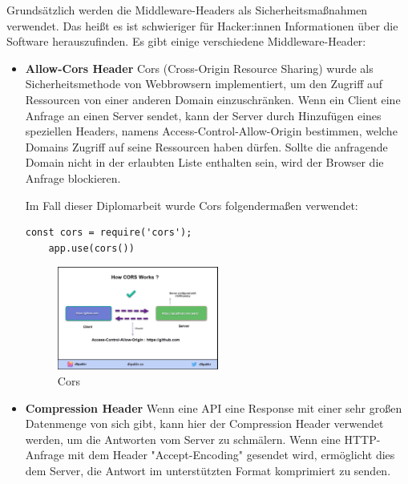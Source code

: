 Grundsätzlich werden die Middleware-Headers als Sicherheitsmaßnahmen verwendet. Das heißt es ist schwieriger für Hacker:innen Informationen über die Software herauszufinden. Es gibt einige verschiedene Middleware-Header:

\begin{itemize}
    \item \textbf{Allow-Cors Header}
        \newline
        Cors (Cross-Origin Resource Sharing) wurde als Sicherheitsmethode von Webbrowsern implementiert, um den Zugriff auf Ressourcen von einer anderen Domain einzuschränken. Wenn ein Client eine Anfrage an einen Server sendet, kann der Server durch Hinzufügen eines speziellen Headers, namens Access-Control-Allow-Origin bestimmen, welche Domains Zugriff auf seine Ressourcen haben dürfen. Sollte die anfragende Domain nicht in der erlaubten Liste enthalten sein, wird der Browser die Anfrage blockieren.

        Im Fall dieser Diplomarbeit wurde Cors folgendermaßen verwendet:

\begin{lstlisting}[caption=Verwendung von Cors]
    const cors = require('cors');
    app.use(cors())
\end{lstlisting}
                
\begin{figure}[h]
    \centering
    \includegraphics[width=0.5\textwidth]{pics/cors.png}
    \caption{Cors}
    \label{fig:mesh1}
\end{figure}

        \cite{Cors}
        \newpage
    \item \textbf{Compression Header}
        \newline
        Wenn eine API eine Response mit einer sehr großen Datenmenge von sich gibt, kann hier der Compression Header verwendet werden, um die Antworten vom Server zu schmälern. Wenn eine HTTP-Anfrage mit dem Header "Accept-Encoding" gesendet wird, ermöglicht dies dem Server, die Antwort im unterstützten Format komprimiert zu senden.


\end{itemize}
